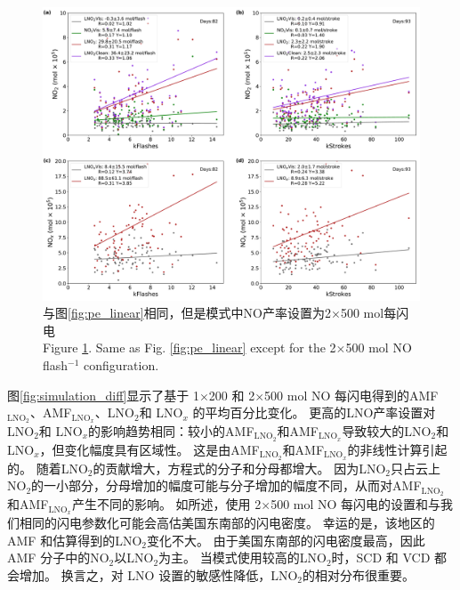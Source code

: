 \begin{figure}[htbp]
\centering
\includegraphics[width=15cm]{./figures/pe_linear_2x500.pdf}
\caption{与图\ref{fig:pe_linear}相同，但是模式中NO产率设置为2$\times$500 mol每闪电 \\Figure \ref{fig:pe_linear_2x500}. Same as Fig. \ref{fig:pe_linear} except for the 2$\times$500 mol NO flash$^{-1}$ configuration.}
\label{fig:pe_linear_2x500}
\end{figure}

图\ref{fig:simulation_diff}显示了基于 1$\times$200 和 2$\times$500 mol NO 每闪电得到的AMF$_\textrm{LNO$_2$}$、AMF$_\textrm{LNO$_x$}$、LNO$_2$和 LNO$_x$ 的平均百分比变化。
更高的LNO产率设置对LNO$_2$和 LNO$_x$的影响趋势相同：较小的AMF$_\textrm{LNO$_2$}$和AMF$_\textrm{LNO$_x$}$导致较大的LNO$_2$和 LNO$_x$，但变化幅度具有区域性。
这是由AMF$_\textrm{LNO$_2$}$和AMF$_\textrm{LNO$_x$}$的非线性计算引起的。
随着LNO$_2$的贡献增大，方程式的分子和分母都增大。
因为LNO$_2$只占云上NO$_2$的一小部分，分母增加的幅度可能与分子增加的幅度不同，从而对AMF$_\textrm{LNO$_2$}$和AMF$_\textrm{LNO$_x$}$产生不同的影响。
如\citet{Zhu.2019}所述，使用 2$\times$500 mol NO 每闪电的设置和与我们相同的闪电参数化可能会高估美国东南部的闪电密度。
幸运的是，该地区的 AMF 和估算得到的LNO$_2$变化不大。
由于美国东南部的闪电密度最高，因此 AMF 分子中的NO$_2$以LNO$_2$为主。
当模式使用较高的LNO$_2$时，SCD 和 VCD 都会增加。
换言之，对 LNO 设置的敏感性降低，LNO$_2$的相对分布很重要。

